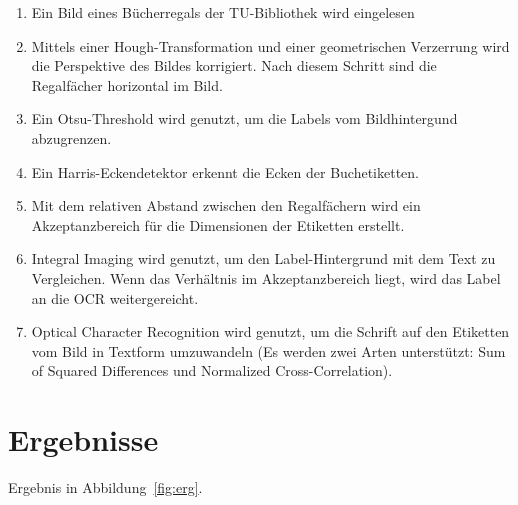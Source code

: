 \documentclass[deutsch]{scrartcl}
\begin{document}
\begin{enumerate}
	\item Ein Bild eines Bücherregals der TU-Bibliothek wird eingelesen
	\item Mittels einer Hough-Transformation und einer geometrischen Verzerrung wird die Perspektive des Bildes korrigiert. Nach diesem Schritt sind die Regalfächer horizontal im Bild.
	\item Ein Otsu-Threshold wird genutzt, um die Labels vom Bildhintergund abzugrenzen.
	\item Ein Harris-Eckendetektor erkennt die Ecken der Buchetiketten.
	\item Mit dem relativen Abstand zwischen den Regalfächern wird ein Akzeptanzbereich für die Dimensionen der Etiketten  erstellt.
	\item Integral Imaging wird genutzt, um den Label-Hintergrund mit dem Text zu Vergleichen. Wenn das Verhältnis im Akzeptanzbereich liegt, wird das Label an die OCR weitergereicht.
	\item Optical Character Recognition wird genutzt, um die Schrift auf den Etiketten vom Bild in Textform umzuwandeln (Es werden zwei Arten unterstützt: Sum of Squared Differences und Normalized Cross-Correlation).
\end{enumerate}

\section*{Ergebnisse}
Ergebnis in Abbildung~\ref{fig:erg}.
\end{document}
